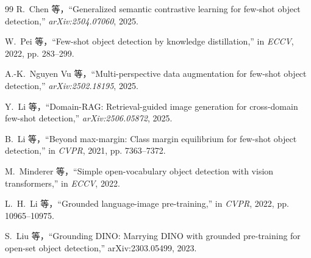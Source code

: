 \documentclass[conference]{IEEEtran}
\begin{document}
\begin{thebibliography}{99}
R.~Chen 等，``Generalized semantic contrastive learning for few-shot object detection,'' \emph{arXiv:2504.07060}, 2025.

W.~Pei 等，``Few-shot object detection by knowledge distillation,'' in \emph{ECCV}, 2022, pp. 283--299.

A.-K.~Nguyen Vu 等，``Multi-perspective data augmentation for few-shot object detection,'' \emph{arXiv:2502.18195}, 2025.

Y.~Li 等，``Domain-RAG: Retrieval-guided image generation for cross-domain few-shot detection,'' \emph{arXiv:2506.05872}, 2025.

B.~Li 等，``Beyond max-margin: Class margin equilibrium for few-shot object detection,'' in \emph{CVPR}, 2021, pp. 7363--7372.

M.~Minderer 等，``Simple open-vocabulary object detection with vision transformers,'' in \emph{ECCV}, 2022.

L.~H.~Li 等，``Grounded language-image pre-training,'' in \emph{CVPR}, 2022, pp. 10965--10975.

S.~Liu 等，``Grounding DINO: Marrying DINO with grounded pre-training for open-set object detection,'' arXiv:2303.05499, 2023.

\end{thebibliography}
\end{document}
